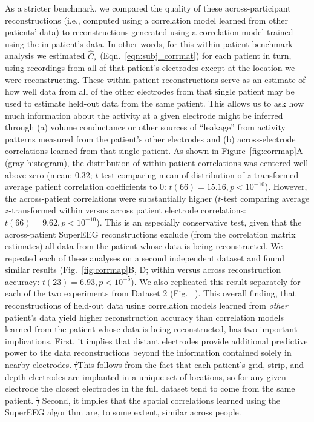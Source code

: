 \documentclass[10pt]{article}
\newcommand{\splitexpcorrmaps}{S3} %
\providecommand{\DIFaddtex}[1]{{\protect\color{blue}\uwave{#1}}} %
\providecommand{\DIFdeltex}[1]{{\protect\color{red}\sout{#1}}}                      %
\providecommand{\DIFaddbegin}{} %
\providecommand{\DIFaddend}{} %
\providecommand{\DIFdelbegin}{} %
\providecommand{\DIFdelend}{} %
\providecommand{\DIFadd}[1]{\texorpdfstring{\DIFaddtex{#1}}{#1}} %
\providecommand{\DIFdel}[1]{\texorpdfstring{\DIFdeltex{#1}}{}} %
\newcommand{\DIFscaledelfig}{0.5}
\newlength{\DIFdelgraphicswidth} %
\newlength{\DIFdelgraphicsheight} %
\newcommand{\DIFaddincludegraphics}[2][]{{\color{blue}\fbox{\DIFOincludegraphics[#1]{#2}}}} %
\newcommand{\DIFdelincludegraphics}[2][]{%
\sbox{\DIFdelgraphicsbox}{\DIFOincludegraphics[#1]{#2}}%
\settoboxwidth{\DIFdelgraphicswidth}{\DIFdelgraphicsbox} %
\settoboxtotalheight{\DIFdelgraphicsheight}{\DIFdelgraphicsbox} %
\scalebox{\DIFscaledelfig}{%
\parbox[b]{\DIFdelgraphicswidth}{\usebox{\DIFdelgraphicsbox}\\[-\baselineskip] \rule{\DIFdelgraphicswidth}{0em}}\llap{\resizebox{\DIFdelgraphicswidth}{\DIFdelgraphicsheight}{%
\setlength{\unitlength}{\DIFdelgraphicswidth}%
\begin{picture}(1,1)%
\thicklines\linethickness{2pt} %
{\color[rgb]{1,0,0}\put(0,0){\framebox(1,1){}}}%
{\color[rgb]{1,0,0}\put(0,0){\line( 1,1){1}}}%
{\color[rgb]{1,0,0}\put(0,1){\line(1,-1){1}}}%
\end{picture}%
}\hspace*{3pt}}} %
} %
\DeclareRobustCommand{\DIFaddbegin}{\DIFOaddbegin \let\includegraphics\DIFaddincludegraphics} %
\DeclareRobustCommand{\DIFaddend}{\DIFOaddend \let\includegraphics\DIFOincludegraphics} %
\DeclareRobustCommand{\DIFdelbegin}{\DIFOdelbegin \let\includegraphics\DIFdelincludegraphics} %
\DeclareRobustCommand{\DIFdelend}{\DIFOaddend \let\includegraphics\DIFOincludegraphics} %
\begin{document}
\DIFdelbegin \DIFdel{As a stricter benchmark}\DIFdelend \DIFaddbegin \DIFadd{Next}\DIFaddend , we compared the quality of these across-participant reconstructions (i.e.,
computed using a correlation model learned from other patients' data) to
reconstructions generated using a correlation model trained using the
in-patient's data.  In other words, for this within-patient benchmark analysis
we estimated $\hat{C}_{s}$ (Eqn.~\ref{eqn:subj_corrmat}) for each patient in
turn, using recordings from all of that patient's electrodes except at the
location we were reconstructing.  These within-patient reconstructions serve as
an estimate of how well data from all of the other electrodes from that single
patient may be used to estimate held-out data from the same patient.  This
allows us to ask how much information about the activity at a given electrode
might be inferred through (a) volume conductance or other sources of ``leakage''
from activity patterns measured from the patient's other electrodes and (b)
across-electrode correlations learned from that single patient.  As shown in
Figure~\ref{fig:corrmap}A (gray histogram), the distribution of within-patient
correlations was centered well above zero (mean: \DIFdelbegin \DIFdel{0.32}\DIFdelend \DIFaddbegin \DIFadd{$r = 0.32$}\DIFaddend ; $t$-test comparing
mean of distribution of $z$-transformed average patient correlation coefficients
to 0: $t(66) = 15.16, p < 10^{-10}$). However, the across-patient correlations
were substantially higher ($t$-test comparing average $z$-transformed within
versus across patient electrode correlations: \DIFdelbegin \DIFdel{$t(66) = 9.62, p < 10^{-10}$}\DIFdelend \DIFaddbegin \DIFadd{$t(66) = 9.17, p < 10^{-10}$}\DIFaddend ).
This is an especially conservative test, given that the across-patient SuperEEG
reconstructions exclude (from the correlation matrix estimates) all data from
the patient whose data is being reconstructed.  We repeated each of these
analyses on a second independent dataset and found similar results
(Fig.~\ref{fig:corrmap}B, D; within versus across reconstruction accuracy:
\DIFdelbegin \DIFdel{$t(23) = 6.93, p < 10^{-5}$}\DIFdelend \DIFaddbegin \DIFadd{$t(77) = 11.25, p < 10^{-10}$}\DIFaddend ). We also replicated this result separately for
each of the two experiments from Dataset 2 (Fig.~\DIFdelbegin %
\DIFdelend \DIFaddbegin \DIFadd{\splitexpcorrmaps}\DIFaddend ).  This overall
finding, that reconstructions of held-out data using correlation models learned
from \textit{other} patient's data yield higher reconstruction accuracy than
correlation models learned from the patient whose data is being reconstructed,
has two important implications.  First, it implies that distant electrodes
provide additional predictive power to the data reconstructions beyond the
information contained solely in nearby electrodes.  \DIFdelbegin \DIFdel{(}\DIFdelend This follows from the fact
that each patient's grid, strip, and depth electrodes are implanted in a unique
set of locations, so for any given electrode the closest electrodes in the full
dataset tend to come from the same patient.  \DIFdelbegin \DIFdel{)  }\DIFdelend Second, it implies that the
spatial correlations learned using the SuperEEG algorithm are, to some extent,
similar across people.
\end{document}
